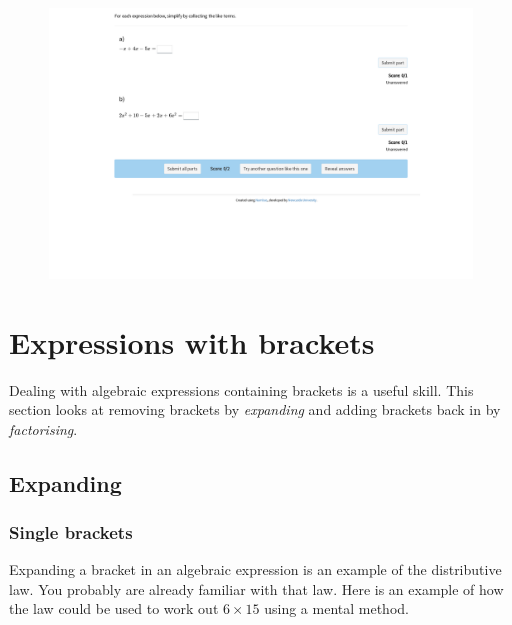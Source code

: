 \documentclass[
  a4paper,
]{scrbook}
\begin{document}
\begin{figure}

{\centering 

\href{https://numbas.mathcentre.ac.uk/question/104233/collect-like-terms/embed/?token=e5fdc25c-98a0-4df2-9a2f-45cc8a15b5f4}{\includegraphics{./02-algebraic_expressions_files/figure-pdf/unnamed-chunk-2-1.png}}

}

\end{figure}


\hypertarget{expressions-with-brackets}{%
\chapter{Expressions with brackets}\label{expressions-with-brackets}}

Dealing with algebraic expressions containing brackets is a useful
skill. This section looks at removing brackets by \emph{expanding} and
adding brackets back in by \emph{factorising}.

\hypertarget{expanding}{%
\section{Expanding}\label{expanding}}

\hypertarget{single-brackets}{%
\subsection{Single brackets}\label{single-brackets}}

Expanding a bracket in an algebraic expression is an example of the
distributive law. You probably are already familiar with that law. Here
is an example of how the law could be used to work out \(6 \times 15\)
using a mental method.
\end{document}
